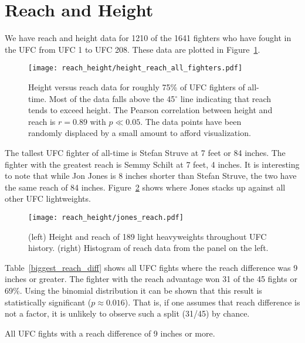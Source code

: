 \clearpage
\section{Reach and Height}

We have reach and height data for 1210 of the 1641 fighters who have fought in the
UFC from UFC 1 to UFC 208. These data are plotted in Figure~\ref{height_reach_all_fighters}.

\begin{figure}[h]
\begin{center}
\texttt{[image: reach\_height/height\_reach\_all\_fighters.pdf]}
\caption{Height versus reach data for roughly 75\% of UFC fighters
of all-time.
Most of the data falls above the 45$^{\circ}$ line indicating that
reach tends to exceed height. The Pearson correlation between height
and reach is $r=0.89$ with $p\ll 0.05$. The data points have been randomly displaced
by a small amount to afford visualization.}
\label{height_reach_all_fighters}
\end{center}
\end{figure}

The tallest UFC fighter of all-time is Stefan Struve at 7 feet or 84 inches. The fighter
with the greatest reach is Semmy Schilt at 7 feet, 4 inches. It is interesting
to note that while Jon Jones is 8 inches shorter than
Stefan Struve, the two have the same reach of 84 inches. Figure~\ref{jones_reach} shows
where Jones stacks up against all other UFC lightweights.

\begin{figure}[h]
\begin{center}
\texttt{[image: reach\_height/jones\_reach.pdf]}
\caption{(left) Height and reach of 189 light heavyweights throughout
UFC history.
(right) Histogram of reach data from the panel on the left.}
\label{jones_reach}
\end{center}
\end{figure}

Table~\ref{biggest_reach_diff} shows all UFC fights where the reach difference
was 9 inches or greater. The fighter with the
reach advantage won 31 of the 45 fights or 69\%. Using the
binomial distribution it can be shown that this result is
statistically significant ($p\approx0.016$). That is, if one
assumes that reach difference is not a factor, it is unlikely to observe
such a split (31/45) by chance.

\begin{center}
\begin{table}[h]

\caption{All UFC fights with a reach difference of 9 inches or more.}
\label{biggest_reach_diff}
\end{table}
\end{center}

